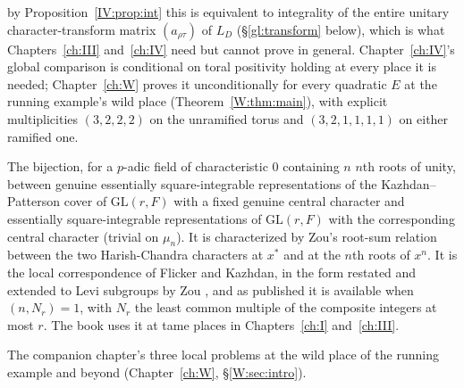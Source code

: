 \begin{description}
by Proposition~\ref{IV:prop:int} this is equivalent to integrality of
the entire unitary character-transform matrix $(a_{\rho\tau})$ of
$L_D$ (\S\ref{gl:transform} below), which is what Chapters~\ref{ch:III}
and~\ref{ch:IV} need but cannot prove in general. Chapter~\ref{ch:IV}'s
global comparison is conditional on toral positivity holding at every
place it is needed; Chapter~\ref{ch:W} proves it unconditionally for
every quadratic $E$ at the running example's wild place
(Theorem~\ref{W:thm:main}), with explicit multiplicities $(3,2,2,2)$
on the unramified torus and $(3,2,1,1,1,1)$ on either ramified one.
\item[Flicker--Kazhdan--Zou correspondence $\mathrm{MC}$] The bijection, for a $p$-adic field of characteristic $0$ containing $n$ $n$th roots of unity, between genuine essentially square-integrable representations of the Kazhdan--Patterson cover of $\mathrm{GL}(r,F)$ with a fixed genuine central character and essentially square-integrable representations of $\mathrm{GL}(r,F)$ with the corresponding central character (trivial on $\mu_n$). It is characterized by Zou's root-sum relation between the two Harish-Chandra characters at $x^*$ and at the $n$th roots of $x^n$. It is the local correspondence of Flicker and Kazhdan, in the form restated and extended to Levi subgroups by Zou \cite[Definition~3.7]{Zo23}, and as published it is available when $(n,N_r)=1$, with $N_r$ the least common multiple of the composite integers at most $r$. The book uses it at tame places in Chapters~\ref{ch:I} and~\ref{ch:III}.
\item[Targets A, B, C] The companion chapter's three local problems at
the wild place of the running example and beyond (Chapter~\ref{ch:W}, \S\ref{W:sec:intro}).
\end{description}

